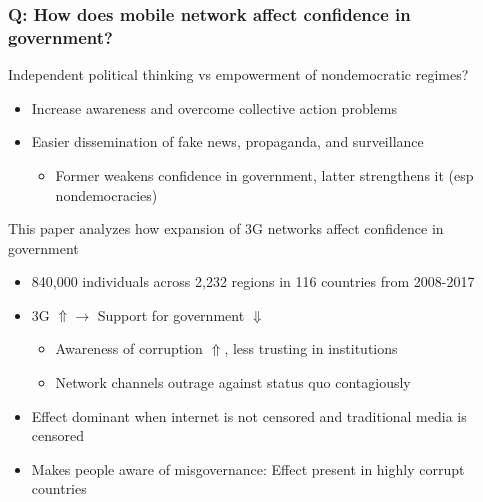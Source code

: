 \documentclass[aspectratio=169]{beamer}
\begin{document}
\begin{frame}
\frametitle{Q: How does mobile network affect confidence in government?}
 Independent political thinking vs empowerment of nondemocratic regimes?
\begin{itemize}\setlength\itemsep{3pt}
\item Increase awareness and overcome collective action problems 
\item Easier dissemination of fake news, propaganda, and surveillance
\begin{itemize}
\item Former weakens confidence in government, latter strengthens it (esp nondemocracies)
\end{itemize}
\end{itemize}\medskip
This paper analyzes how expansion of 3G networks affect confidence in government
\begin{itemize}\setlength\itemsep{3pt}
\item 840,000 individuals across 2,232 regions in 116 countries from 2008-2017
\item 3G $\Uparrow \to$ Support for government $\Downarrow$ 
\begin{itemize}\setlength\itemsep{3pt}
\item Awareness of corruption $\Uparrow$, less trusting in institutions
\item Network channels outrage against status quo contagiously
\end{itemize}
\item Effect dominant when internet is not censored and traditional media is censored
\item Makes people aware of misgovernance: Effect present in highly corrupt countries
\end{itemize}
\end{frame}
\end{document}
